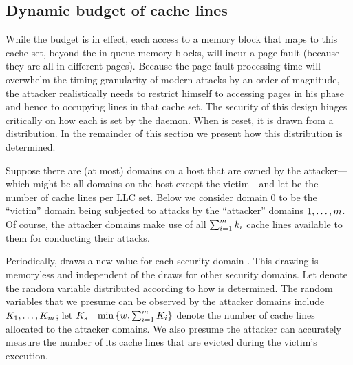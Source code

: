 \subsection{Dynamic budget \linesPerContainer{\containerIdx} of
cache lines}
\label{cachebar:sec:cacheabilityMgmt:security}
While the budget \linesPerContainer{\containerIdx} is in effect, each
access to a memory block that maps to this cache set, beyond the
in-queue \linesPerContainer{\containerIdx} memory blocks, will incur a
page fault (because they are all in different pages).  Because the
page-fault processing time will overwhelm the timing granularity of
modern \primeprobe attacks by an order of magnitude, the attacker
\containerIdx realistically needs to restrict himself to accessing
\linesPerContainer{\containerIdx} pages in his \Probe phase and hence
to occupying \linesPerContainer{\containerIdx} lines in that cache
set. The security of this design hinges critically on how each
\linesPerContainer{\containerIdx} is set by the daemon.  When
\linesPerContainer{\containerIdx} is reset, it is drawn from a
distribution.  In the remainder of this section we present how this
distribution is determined.
\fi

Suppose there are (at most) \attackerNmbr domains on a host that are
owned by the attacker---which might be all  domains on the host except
the victim---and let \cacheLineNmbr be the number of cache lines per
\gls{LLC} set. Below we consider domain $0$ to be the ``victim''
domain being subjected to \primeprobe attacks by the ``attacker''
domains $1, \ldots, m$.  Of course, the attacker domains
make use of all $\sum_{i=1}^{m}
k_{i}$ cache lines available to them for
conducting their \primeprobe attacks.

Periodically, \cachebar draws a new value
\linesPerContainer{\containerIdx} for each security domain
\containerIdx.  This drawing is memoryless and independent of the
draws for other security domains.  Let
\linesPerContainerRV{\containerIdx} denote the random variable
distributed according to how \linesPerContainer{\containerIdx} is
determined.  The random variables that we presume can be observed by
the attacker domains include $K_{1}, \ldots,
K_{m}$; let $K_{\mathsf{a}}{}\!=
\!\min\left\{w, \sum_{i=1}^{m}
K_{i}\right\}$ denote the number of
cache lines allocated to the attacker domains.  We also presume the
attacker can accurately measure the number \evictedNmbrRV of its cache
lines that are evicted during the victim's execution.

